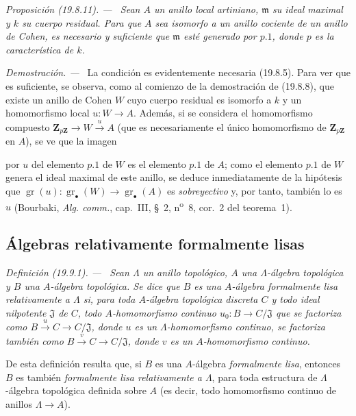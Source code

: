 \documentclass[10pt,oneside]{book}
\makeatletter
\newcommand{\gr}{\operatorname{gr}}
\newcommand{\setmanualcurrentlabel}[1]{\def\@currentlabel{#1}}
\newcommand{\oldpage}[2][]{%
  \setcounter{footnote}{0}%
  \marginpar{\scriptsize\textbf{#1}~|~#2}\ignorespaces}
\newenvironment{definition}[1][]{%
  \setmanualcurrentlabel{#1}\par\medskip\noindent\itshape Definición (#1). ---\ }{\par}
\newenvironment{proposition}[1][]{%
  \setmanualcurrentlabel{#1}\par\medskip\noindent\itshape Proposición (#1). ---\ }{\par}
\newenvironment{proof}{%
  \par\medskip\noindent\textit{Demostración. ---\ }}{\par}
\makeatother
\begin{document}
\begin{proposition}[19.8.11]
\label{0.19.8.11-es}
Sean $A$ un anillo local artiniano, $\mathfrak m$ su ideal maximal y $k$ su
cuerpo residual. Para que $A$ sea isomorfo a un anillo cociente de un anillo
de Cohen, es necesario y suficiente que $\mathfrak m$ esté generado por
$p.1$, donde $p$ es la característica de $k$.
\end{proposition}

\begin{proof}
La condición es evidentemente necesaria (19.8.5). Para ver que es suficiente,
se observa, como al comienzo de la demostración de (19.8.8), que existe un
anillo de Cohen $W$ cuyo cuerpo residual es isomorfo a $k$ y un homomorfismo
local $u:W\to A$. Además, si se considera el homomorfismo compuesto
$\mathbf Z_{p\mathbf Z}\to W\xrightarrow{u}A$ (que es necesariamente el único
homomorfismo de $\mathbf Z_{p\mathbf Z}$ en $A$), se ve que la imagen

\oldpage[0\textsubscript{IV-1}]{114}

por $u$ del elemento $p.1$ de $W$ es el elemento $p.1$ de $A$; como
el elemento $p.1$ de $W$ genera el ideal maximal de este anillo, se deduce
inmediatamente de la hipótesis que
$\gr(u):\gr_\bullet(W)\to\gr_\bullet(A)$ es \emph{sobreyectivo} y, por tanto, también
lo es $u$ (Bourbaki, \emph{Alg. comm.}, cap.~III, §~2,
n\textsuperscript{o}~8, cor.~2 del teorema~1).
\end{proof}
\subsection{Álgebras relativamente formalmente lisas}
\label{subsection:0.19.9-es}

\begin{definition}[19.9.1]
\label{0.19.9.1-es}
Sean $\Lambda$ un anillo topológico, $A$ una $\Lambda$-álgebra topológica y
$B$ una $A$-álgebra topológica. Se dice que $B$ es una $A$-álgebra
\emph{formalmente lisa relativamente a $\Lambda$} si, para toda $A$-álgebra
topológica discreta $C$ y todo ideal nilpotente $\mathfrak J$ de $C$, todo
$A$-homomorfismo continuo $u_0:B\to C/\mathfrak J$ que se factoriza como
$B\xrightarrow{u}C\to C/\mathfrak J$, donde $u$ es un \textup{$\Lambda$-homomorfismo}
continuo, se factoriza también como $B\xrightarrow{v}C\to C/\mathfrak J$, donde
$v$ es un \textup{$A$-homomorfismo} continuo.
\end{definition}

De esta definición resulta que, si $B$ es una $A$-álgebra \emph{formalmente
lisa}, entonces $B$ es también \emph{formalmente lisa relativamente a
$\Lambda$}, para toda estructura de $\Lambda$-álgebra topológica definida sobre
$A$ (es decir, todo homomorfismo continuo de anillos $\Lambda\to A$).
\end{document}
